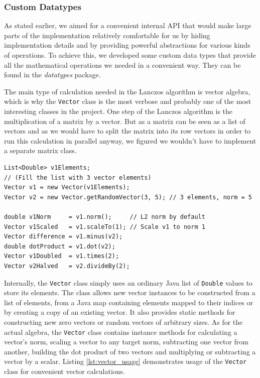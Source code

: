
\subsubsection{Custom Datatypes}
\label{ssec:custom_datatypes}

As stated earlier, we aimed for a convenient internal API that would make large
parts of the implementation relatively comfortable for us by hiding
implementation details and by providing powerful abstractions for various kinds
of operations. To achieve this, we developed some custom data types that
provide all the mathematical operations we needed in a convenient way. They can
be found in the \textit{datatypes} package.


The main type of calculation needed in the Lanczos algorithm is vector algebra,
which is why the \texttt{Vector} class is the most verbose and probably one of
the most interesting classes in the project. One step of the Lanczos algorithm
is the multiplication of a matrix by a vector. But as a matrix can be seen as a
list of vectors and as we would have to split the matrix into its row vectors
in order to run this calculation in parallel anyway, we figured we wouldn't
have to implement a separate matrix class.

\begin{lstlisting}[label=lst:vector_usage,captionpos=b,caption=Example use of
the \texttt{Vector} class]
List<Double> v1Elements;
// (Fill the list with 3 vector elements)
Vector v1 = new Vector(v1Elements);
Vector v2 = new Vector.getRandomVector(3, 5); // 3 elements, norm = 5

double v1Norm     = v1.norm();     // L2 norm by default
Vector v1Scaled   = v1.scaleTo(1); // Scale v1 to norm 1
Vector difference = v1.minus(v2);
double dotProduct = v1.dot(v2);
Vector v1Doubled  = v1.times(2);
Vector v2Halved   = v2.divideBy(2);
\end{lstlisting}

Internally, the \texttt{Vector} class simply uses an ordinary Java list of
\texttt{Double} values to store its elements. The class allows new vector
instances to be constructed from a list of elements, from a Java map containing
elements mapped to their indices or by creating a copy of an existing vector.
It also provides static methods for constructing new zero vectors or random
vectors of arbitrary sizes. As for the actual algebra, the \texttt{Vector}
class contains instance methods for calculating a vector's norm, scaling a
vector to any target norm, subtracting one vector from another, building the
dot product of two vectors and multiplying or subtracting a vector by a scalar.
Listing \ref{lst:vector_usage} demonstrates usage of the \texttt{Vector} class
for convenient vector calculations.

